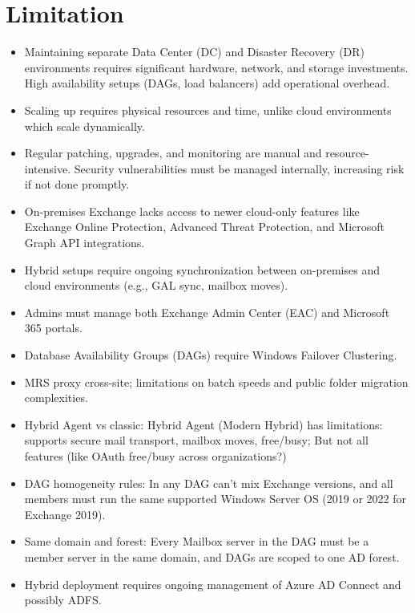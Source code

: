 \section{Limitation}
\begin{itemize}
\item Maintaining separate Data Center (DC) and Disaster Recovery (DR) environments requires significant hardware, network, and storage investments. High availability setups (DAGs, load balancers) add operational overhead.
\item Scaling up requires physical resources and time, unlike cloud environments which scale dynamically.
\item Regular patching, upgrades, and monitoring are manual and resource-intensive. Security vulnerabilities must be managed internally, increasing risk if not done promptly.
\item On-premises Exchange lacks access to newer cloud-only features like Exchange Online Protection, Advanced Threat Protection, and Microsoft Graph API integrations.
\item Hybrid setups require ongoing synchronization between on-premises and cloud environments (e.g., GAL sync, mailbox moves).
\item Admins must manage both Exchange Admin Center (EAC) and Microsoft 365 portals.
\item Database Availability Groups (DAGs) require Windows Failover Clustering.
\item MRS proxy cross-site; limitations on batch speeds and public folder migration complexities.
\item Hybrid Agent vs classic: Hybrid Agent (Modern Hybrid) has limitations: supports secure mail transport, mailbox moves, free/busy; But not all features (like OAuth free/busy across organizations?)
\item DAG homogeneity rules: In any DAG can’t mix Exchange versions, and all members must run the same supported Windows Server OS (2019 or 2022 for Exchange 2019).
\item Same domain and forest: Every Mailbox server in the DAG must be a member server in the same domain, and DAGs are scoped to one AD forest.
\item Hybrid deployment requires ongoing management of Azure AD Connect and possibly ADFS. \cite{c4}
\end{itemize}

\label{sec:EffSearch} 


